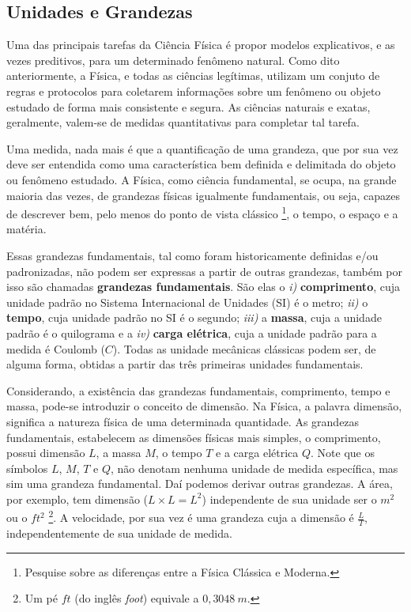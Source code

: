 \documentclass[a4paper, 11pt]{report}
\begin{document}
\subsection{Unidades e Grandezas}

Uma das principais tarefas da Ciência Física é propor modelos explicativos, e 
as vezes preditivos, para um determinado fenômeno natural. Como dito
anteriormente, a Física, e todas as ciências legítimas, utilizam um conjuto de 
regras e protocolos para coletarem informações sobre um fenômeno ou objeto 
estudado de forma mais consistente e segura. As ciências naturais e exatas, 
geralmente, valem-se de medidas quantitativas para completar tal tarefa. 

Uma medida, nada mais é que a quantificação de uma grandeza, que por sua vez 
deve ser entendida como uma característica bem definida e delimitada do objeto
ou fenômeno estudado. A Física, como ciência fundamental, se ocupa, na grande 
maioria das vezes, de grandezas físicas igualmente fundamentais, ou seja, 
capazes de descrever bem, pelo menos do ponto de vista clássico \footnote{
    Pesquise sobre as diferenças entre a Física Clássica e Moderna.
}, o tempo, o espaço e a matéria.

Essas grandezas fundamentais, tal como foram historicamente definidas e/ou 
padronizadas, não podem ser expressas a partir de outras grandezas, também por 
isso são chamadas \textbf{grandezas fundamentais}. São elas o 
\emph{i)} \textbf{comprimento}, cuja unidade padrão no Sistema Internacional de
Unidades (SI) é o metro; \emph{ii)} o \textbf{tempo}, cuja unidade padrão no SI
é o segundo; \emph{iii)} a \textbf{massa}, cuja a unidade padrão é o quilograma
e a \emph{iv)} \textbf{carga elétrica}, cuja a unidade padrão para a medida é 
Coulomb ($C$). Todas as unidade mecânicas clássicas podem ser, de alguma forma, 
obtidas a partir das três primeiras unidades fundamentais. 

Considerando, a existência das grandezas fundamentais, comprimento, tempo e 
massa, pode-se introduzir o conceito de dimensão. Na Física, a palavra dimensão, 
significa a natureza física de uma determinada quantidade. As grandezas 
fundamentais, estabelecem as dimensões físicas mais simples, o comprimento, 
possui dimensão $L$, a massa $M$, o tempo $T$ e a carga elétrica $Q$. Note que
os símbolos $L$, $M$, $T$ e $Q$, não denotam nenhuma unidade de medida 
específica, mas sim uma grandeza fundamental. Daí podemos derivar outras 
grandezas. A área, por exemplo, tem dimensão ($L \times L = L^2$) independente 
de sua unidade ser o $m^2$ ou o $ft^2$
\footnote{
    Um pé $ft$ (do inglês \emph{foot}) equivale a $0,3048\:m$.
}. A velocidade, por sua vez é uma grandeza cuja a dimensão é $\frac{L}{T}$, 
independentemente de sua unidade de medida. 
\end{document}
